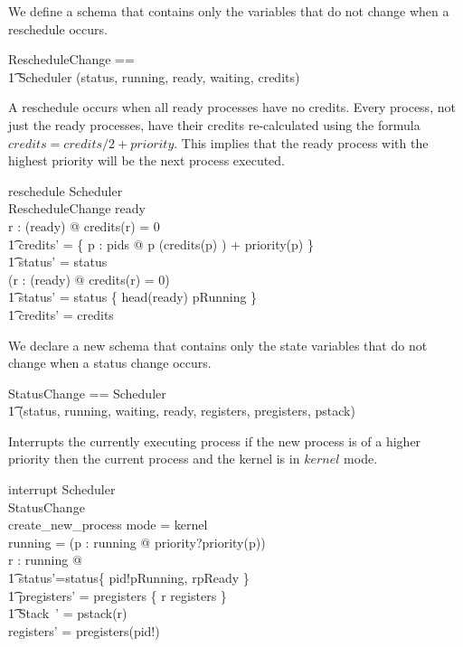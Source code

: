 \documentclass{article}
\begin{document}
We define a schema that contains only the variables that do not change
when a reschedule occurs.

\begin{zed}
  RescheduleChange == \\
    \t1 Scheduler \hide (status, running, ready, waiting, credits)
\end{zed}

A reschedule occurs when all ready processes have no credits. Every
process, not just the ready processes, have their credits
re-calculated using the formula $credits = credits/2 + priority$. This
implies that the ready process with the highest priority will be the
next process executed.

\begin{schema}{reschedule}
  \Delta Scheduler\\
  \Xi RescheduleChange
\where
  ready \neq \emptyset\\
  \forall r : \ran(ready) @ credits(r) = 0 \implies\\
    \t1 credits' =
      \{ p : pids @ p \mapsto (credits(p) ) + priority(p) \} \land\\
    \t1 status' = status\\
  \lnot (\forall r : \ran(ready) @ credits(r) = 0) \implies\\
    \t1 status' = status \oplus \{ head(ready) \mapsto pRunning \} \land\\
    \t1 credits' = credits
\end{schema}

We declare a new schema that contains only the state variables that do
not change when a status change occurs.

\begin{zed}
  StatusChange == Scheduler \hide\\
    \t1 (status, running, waiting, ready, registers, pregisters, pstack)
\end{zed}

Interrupts the currently executing process if the new process is of a
higher priority then the current process and the kernel is in $kernel$
mode.

\begin{schema}{interrupt}
  \Delta Scheduler\\
  \Xi StatusChange\\
  create\_new\_process
\where
  mode = kernel\\
  running = \emptyset\lor(\exists p : running @ priority?\geq priority(p))\\
  \exists r : running @\\
    \t1 status'=status\oplus\{ pid!\mapsto pRunning, r\mapsto pReady \}\land\\
    \t1 pregisters' = pregisters \oplus \{ r \mapsto registers \} \land\\
    \t1 \theta Stack~' = pstack(r)\\
  registers' = pregisters(pid!)
\end{schema}
\end{document}
